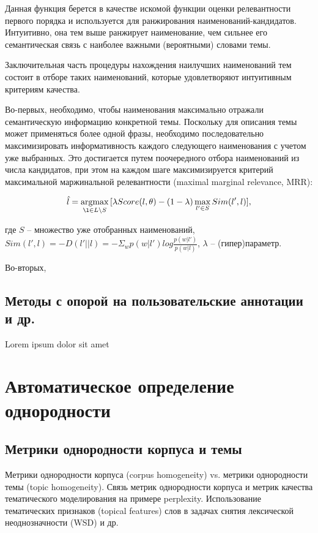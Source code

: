 Данная функция берется в качестве искомой функции оценки релевантности первого порядка и используется для ранжирования наименований-кандидатов. Интуитивно, она тем выше ранжирует наименование, чем сильнее его семантическая связь с наиболее важными (вероятными) словами темы.

Заключительная часть процедуры нахождения наилучших наименований тем состоит в отборе таких наименований, которые удовлетворяют интуитивным критериям качества. 

Во-первых, необходимо, чтобы наименования максимально отражали семантическую информацию конкретной темы. Поскольку для описания темы может применяться более одной фразы, необходимо последовательно максимизировать информативность каждого следующего наименования с учетом уже выбранных. Это достигается путем поочередного отбора наименований из числа кандидатов, при этом на каждом шаге максимизируется критерий максимальной маржинальной релевантности (maximal marginal relevance, MRR):

\[\hat{l} = \argmax_{\l \in L\setminus S} \, [\lambda Score(l, \theta) - (1-\lambda)\max_{l' \in S} Sim(l', l)], \]

\noindent где $S$ -- множество уже отобранных наименований, $Sim(l', l) = -D(l'||l) = -\Sigma_w p(w|l') log \frac{p(w|l')}{p(w|l)}$, $\lambda$ -- (гипер)параметр.

Во-вторых,


\section{Методы с опорой на пользовательские аннотации и др.}

Lorem ipsum dolor sit amet



\chapter{Автоматическое определение однородности}

\section{Метрики однородности корпуса и темы}

Метрики однородности корпуса (corpus homogeneity) vs. метрики однородности темы (topic homogeneity). Связь метрик однородности корпуса и метрик качества тематического моделирования на примере perplexity. Использование тематических признаков (topical features) слов в задачах снятия лексической неоднозначности (WSD) и др.

